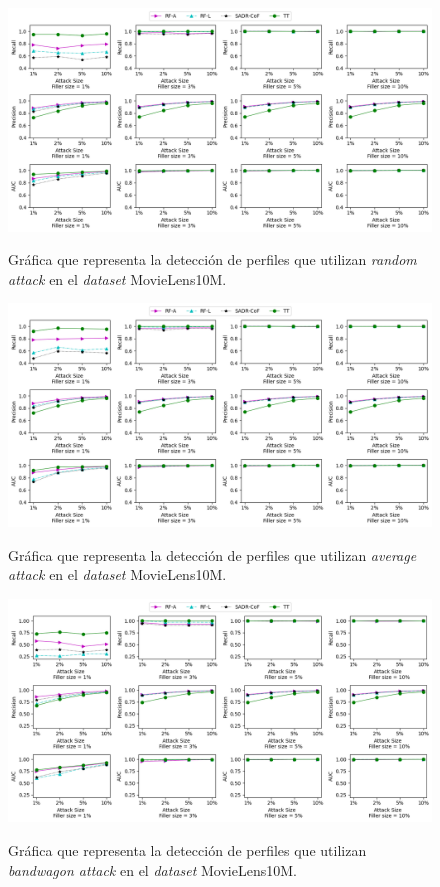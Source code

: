 \begin{figure}[h]
	\caption[\textit{Random attack}: Detección.]{Gráfica que representa la detección de perfiles que utilizan \textit{random attack} en el \textit{dataset} MovieLens10M.}
	\centering
	\includegraphics[scale=0.45]{../img/memoria/5_resultados_random_attack}
	\label{5_random_attack}
\end{figure}

\begin{figure}[h]
	\caption[\textit{Average attack}: Detección.]{Gráfica que representa la detección de perfiles que utilizan \textit{average attack} en el \textit{dataset} MovieLens10M.}
	\centering
	\includegraphics[scale=0.45]{../img/memoria/5_resultados_average_attack}
	\label{5_average_attack}
\end{figure}

\begin{figure}[h]
	\caption[\textit{Bandwagon attack}: Detección.]{Gráfica que representa la detección de perfiles que utilizan \textit{bandwagon attack} en el \textit{dataset} MovieLens10M.}
	\centering
	\includegraphics[scale=0.45]{../img/memoria/5_resultados_bandwagon_attack}
	\label{5_bandwagon_attack}
\end{figure}


